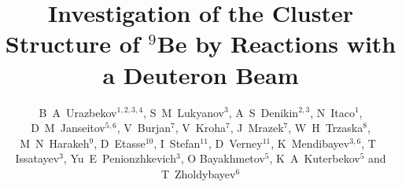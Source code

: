 \documentclass[10pt]{iopart}
\begin{document}
\title[B A Urazbekov \etal ]{Investigation of the Cluster Structure of $^9$Be by Reactions with a Deuteron Beam}

\author{B~A~Urazbekov$^{1,2,3,4}$, S~M~Lukyanov$^3$,  A~S~Denikin$^{2,3}$, N~Itaco$^1$,  D~M~Janseitov$^{5,6}$, V~Burjan$^7$, V~Kroha$^7$, J~Mrazek$^7$, W~H~Trzaska$^8$, M~N~Harakeh$^9$, D~Etasse$^{10}$, I~Stefan$^{11}$, D~Verney$^{11}$, K~Mendibayev$^{3,6}$, T~ Issatayev$^3$, Yu~E~Penionzhkevich$^{3}$,   O Bayakhmetov$^{5}$, K~A~Kuterbekov$^{5}$ and T~Zholdybayev$^{6}$}

\address{$^1$ Dipartimento di Matematica e Fisica,
Universit\`{a} degli Studi della Campania “Luigi Vanvitelli”, I-8110 Caserta, Italy}
\address{$^2$ Dubna State University, 141982 Dubna, Russia}
\address{$^3$ Joint Institute for nuclear research,  141980 Dubna, Russia}
\address{$^4$ Al-Farabi Kazakh National University, 050040 Almaty, Kazakhstan }
\address{$^5$ L~N~Gumilyov Eurasian National University, 010008 Astana, Kazakhstan }
\address{$^6$ Institute of Nuclear Physics, 050032 Almaty, Kazakhstan}
\address{$^7$ Nuclear Physics Institute CAS, 25068 \v{R}e\v{z}, Czech Republic}
\address{$^8$ Department of Physics, University of Jyv\"askyl\"a, FIN-40014 Jyv\"askyl\"a, Finland}
\address{$^9$ KVI-CART, University of Groningen, 9747 AA Groningen, The Netherlands}
\address{$^{10}$ Normandie Universit\'{e}, ENSICAEN, UNICAEN, CNRS/IN2P3, LPC Caen, 14000 Caen, France}
\address{$^{11}$ Institut de Physique Nucl\'{e}aire, Univ. Paris-Sud, Universit\'{e} Paris-Saclay, F-91406 Orsay, France}
\end{document}
